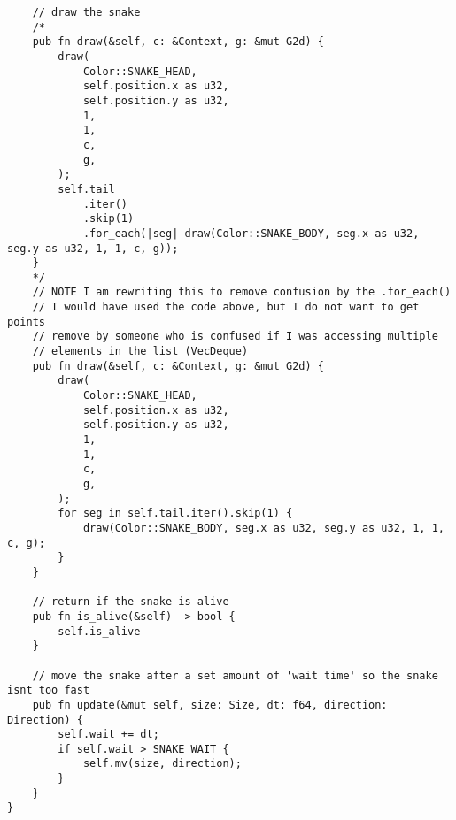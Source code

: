 \documentclass{article}
\begin{document}
\begin{verbatim}
    // draw the snake
    /*
    pub fn draw(&self, c: &Context, g: &mut G2d) {
        draw(
            Color::SNAKE_HEAD,
            self.position.x as u32,
            self.position.y as u32,
            1,
            1,
            c,
            g,
        );
        self.tail
            .iter()
            .skip(1)
            .for_each(|seg| draw(Color::SNAKE_BODY, seg.x as u32, seg.y as u32, 1, 1, c, g));
    }
    */
    // NOTE I am rewriting this to remove confusion by the .for_each()
    // I would have used the code above, but I do not want to get points
    // remove by someone who is confused if I was accessing multiple
    // elements in the list (VecDeque)
    pub fn draw(&self, c: &Context, g: &mut G2d) {
        draw(
            Color::SNAKE_HEAD,
            self.position.x as u32,
            self.position.y as u32,
            1,
            1,
            c,
            g,
        );
        for seg in self.tail.iter().skip(1) {
            draw(Color::SNAKE_BODY, seg.x as u32, seg.y as u32, 1, 1, c, g);
        }
    }

    // return if the snake is alive
    pub fn is_alive(&self) -> bool {
        self.is_alive
    }

    // move the snake after a set amount of 'wait time' so the snake isnt too fast
    pub fn update(&mut self, size: Size, dt: f64, direction: Direction) {
        self.wait += dt;
        if self.wait > SNAKE_WAIT {
            self.mv(size, direction);
        }
    }
}
\end{verbatim}
\end{document}

